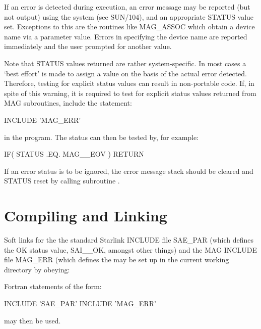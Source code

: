\documentclass[11pt]{starlink}
\begin{document}
If an error is detected during execution, an error message may be reported
(but not output) using the 
system (see SUN/104), and an appropriate STATUS value set.
Exceptions to this are the routines like MAG\_ASSOC which obtain a device name
via a parameter value. Errors in specifying the device name are reported
immediately and the user prompted for another value.

Note that STATUS values returned are rather system-specific. In most cases a
`best effort' is made to assign a value on the basis of the actual error
detected. Therefore, testing for explicit status values can result in
non-portable code. If, in spite of this warning, it is required to test for
explicit status values returned from MAG subroutines, include the statement:

\begin{small}
\begin{terminalv}
INCLUDE 'MAG_ERR'
\end{terminalv}
\end{small}

in the program. The status can then be tested by, for example:

\begin{small}
\begin{terminalv}
IF( STATUS .EQ. MAG__EOV ) RETURN
\end{terminalv}
\end{small}

If an error status is to be ignored, the error message stack should be
cleared and STATUS reset by calling subroutine
.

\section{Compiling and Linking}
Soft links for the the standard Starlink INCLUDE file SAE\_PAR (which defines
the OK status value, SAI\_\_OK, amongst other things) and the MAG INCLUDE file
MAG\_ERR (which defines the
 may be set up in the current
working directory by obeying:
\begin{small}
\begin{terminalv}
\end{terminalv}
\end{small}

Fortran statements of the form:
\begin{small}
\begin{terminalv}
INCLUDE 'SAE_PAR'
INCLUDE 'MAG_ERR'
\end{terminalv}
\end{small}
may then be used.
\end{document}
